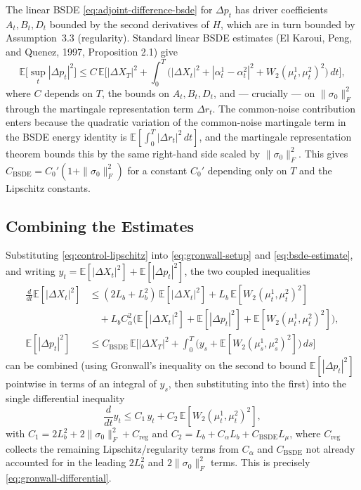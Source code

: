 The linear BSDE \eqref{eq:adjoint-difference-bsde} for $\Delta p_t$ has driver
coefficients $A_t, B_t, D_t$ bounded by the second derivatives of $H$, which are in
turn bounded by Assumption~3.3 (regularity). Standard linear BSDE estimates (El
Karoui, Peng, and Quenez, 1997, Proposition 2.1) give
\[
    \mathbb{E}\Big[\sup_t |\Delta p_t|^2\Big] \leq C \,\mathbb{E}\Big[|\Delta X_T|^2
    + \int_0^T \big(|\Delta X_t|^2 + |\alpha_t^1-\alpha_t^2|^2 +
    W_2(\mu_t^1,\mu_t^2)^2\big)\, dt\Big],
\]
where $C$ depends on $T$, the bounds on $A_t, B_t, D_t$, and --- crucially --- on
$\|\sigma_0\|_F^2$ through the martingale representation term $\Delta r_t$. The
common-noise contribution enters because the quadratic variation of the
common-noise martingale term in the BSDE energy identity is
$\mathbb{E}[\int_0^T |\Delta r_t|^2\, dt]$, and the martingale representation
theorem bounds this by the same right-hand side scaled by $\|\sigma_0\|_F^2$. This
gives $C_{\mathrm{BSDE}} = C_0' (1 + \|\sigma_0\|_F^2)$ for a constant $C_0'$
depending only on $T$ and the Lipschitz constants.

\subsection{Combining the Estimates}

Substituting \eqref{eq:control-lipschitz} into \eqref{eq:gronwall-setup} and
\eqref{eq:bsde-estimate}, and writing $y_t = \mathbb{E}[|\Delta X_t|^2] +
\mathbb{E}[|\Delta p_t|^2]$, the two coupled inequalities
\begin{align*}
    \frac{d}{dt}\mathbb{E}[|\Delta X_t|^2] &\leq (2L_b + L_b^2)\,
        \mathbb{E}[|\Delta X_t|^2] + L_b\, \mathbb{E}[W_2(\mu_t^1,\mu_t^2)^2] \\
        &\quad + L_b C_\alpha^2 \big( \mathbb{E}[|\Delta X_t|^2] + \mathbb{E}[|\Delta p_t|^2]
        + \mathbb{E}[W_2(\mu_t^1,\mu_t^2)^2] \big), \\
    \mathbb{E}[|\Delta p_t|^2] &\leq C_{\mathrm{BSDE}}\, \mathbb{E}\Big[|\Delta
        X_T|^2 + \int_0^T \big( y_s + \mathbb{E}[W_2(\mu_s^1,\mu_s^2)^2]
        \big)\, ds\Big]
\end{align*}
can be combined (using Gronwall's inequality on the second to bound
$\mathbb{E}[|\Delta p_t|^2]$ pointwise in terms of an integral of $y_s$, then
substituting into the first) into the single differential inequality
\[
    \frac{d}{dt} y_t \leq C_1\, y_t + C_2\, \mathbb{E}[W_2(\mu_t^1,\mu_t^2)^2],
\]
with $C_1 = 2L_b^2 + 2\|\sigma_0\|_F^2 + C_{\mathrm{reg}}$ and
$C_2 = L_b + C_\alpha L_b + C_{\mathrm{BSDE}} L_\mu$, where $C_{\mathrm{reg}}$
collects the remaining Lipschitz/regularity terms from $C_\alpha$ and
$C_{\mathrm{BSDE}}$ not already accounted for in the leading $2L_b^2$ and
$2\|\sigma_0\|_F^2$ terms. This is precisely \eqref{eq:gronwall-differential}.


